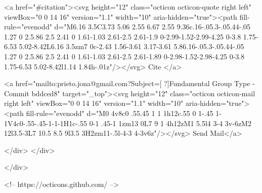       <a  href="#citation"><svg height="12" class="octicon octicon-quote right left" viewBox="0 0 14 16" version="1.1" width="10" aria-hidden="true"><path fill-rule="evenodd" d="M6.16 3.5C3.73 5.06 2.55 6.67 2.55 9.36c.16-.05.3-.05.44-.05 1.27 0 2.5.86 2.5 2.41 0 1.61-1.03 2.61-2.5 2.61-1.9 0-2.99-1.52-2.99-4.25 0-3.8 1.75-6.53 5.02-8.42L6.16 3.5zm7 0c-2.43 1.56-3.61 3.17-3.61 5.86.16-.05.3-.05.44-.05 1.27 0 2.5.86 2.5 2.41 0 1.61-1.03 2.61-2.5 2.61-1.89 0-2.98-1.52-2.98-4.25 0-3.8 1.75-6.53 5.02-8.42l1.14 1.84h-.01z"/></svg> Cite
      </a>

      <a href="mailto:prieto.jona@gmail.com?Subject=[ ?]Fundamental Group Type - Commit bddced8" target="_top"><svg height="12" class="octicon octicon-mail right left" viewBox="0 0 14 16" version="1.1" width="10" aria-hidden="true"><path fill-rule="evenodd" d="M0 4v8c0 .55.45 1 1 1h12c.55 0 1-.45 1-1V4c0-.55-.45-1-1-1H1c-.55 0-1 .45-1 1zm13 0L7 9 1 4h12zM1 5.5l4 3-4 3v-6zM2 12l3.5-3L7 10.5 8.5 9l3.5 3H2zm11-.5l-4-3 4-3v6z"/></svg> Send Mail</a>

    </div>
  </div>

</div>

<!-- https://octicons.github.com/ -->






